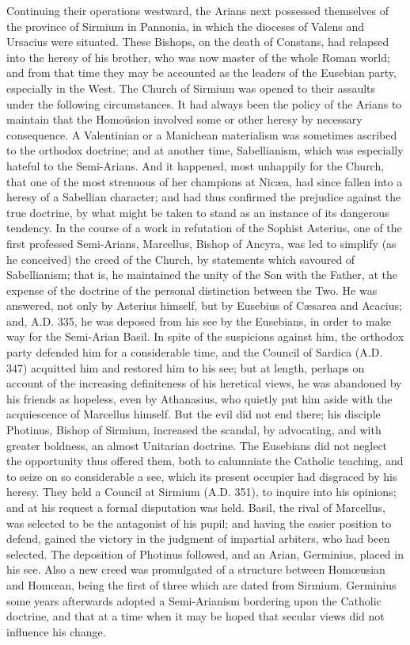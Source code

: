 Continuing their operations westward, the Arians next possessed
themselves of the province of Sirmium in Pannonia, in which the
dioceses of Valens and Ursacius were situated. These Bishops, on the
death of Constans, had relapsed into the heresy of his brother, who
was now master of the whole Roman world; and from that time they may
be accounted as the leaders of the Eusebian party, especially in the
West. The Church of Sirmium was opened to their assaults under the
following circumstances. It had always been the policy of the Arians
to maintain that the Homoüsion involved some or other heresy by
necessary consequence. A Valentinian or a Manichean materialism was
sometimes ascribed to the orthodox doctrine; and at another
time, Sabellianism, which was especially hateful to the Semi-Arians.
And it happened, most unhappily for the Church, that one of the most
strenuous of her champions at Nicæa, had since fallen into a heresy
of a Sabellian character; and had thus confirmed the prejudice against
the true doctrine, by what might be taken to stand as an instance of
its dangerous tendency. In the course of a work in refutation of the
Sophist Asterius, one of the first professed Semi-Arians, Marcellus,
Bishop of Ancyra, was led to simplify (as he conceived) the creed of
the Church, by statements which savoured of Sabellianism; that is, he
maintained the unity of the Son with the Father, at the expense of the
doctrine of the personal distinction between the Two. He was answered,
not only by Asterius himself, but by Eusebius of Cæsarea and Acacius;
and, A.D. 335, he was deposed from his see by
the Eusebians, in order to make way for the Semi-Arian Basil. In spite
of the suspicions against him, the orthodox party defended him for a
considerable time, and the Council of Sardica (A.D.
347) acquitted him and restored him to his see; but at length, perhaps
on account of the increasing definiteness of his heretical views, he
was abandoned by his friends as hopeless, even by Athanasius, who
quietly put him aside with the acquiescence of Marcellus himself. But
the evil did not end there; his disciple Photinus, Bishop of Sirmium,
increased the scandal, by advocating, and with greater boldness, an
almost Unitarian doctrine. The Eusebians did not neglect the
opportunity thus offered them, both to calumniate the Catholic
teaching, and to seize on so considerable a see, which its present
occupier had disgraced by his heresy. They held a Council at
Sirmium (A.D. 351), to inquire into his
opinions; and at his request a formal disputation was held. Basil, the
rival of Marcellus, was selected to be the antagonist of his pupil;
and having the easier position to defend, gained the victory in the
judgment of impartial arbiters, who had been selected. The deposition
of Photinus followed, and an Arian, Germinius, placed in his see. Also
a new creed was promulgated of a structure between Homœusian and
Homœan, being the first of three which are dated from Sirmium.
Germinius some years afterwards adopted a Semi-Arianism bordering upon
the Catholic doctrine, and that at a time when it may be hoped that
secular views did not influence his change.

